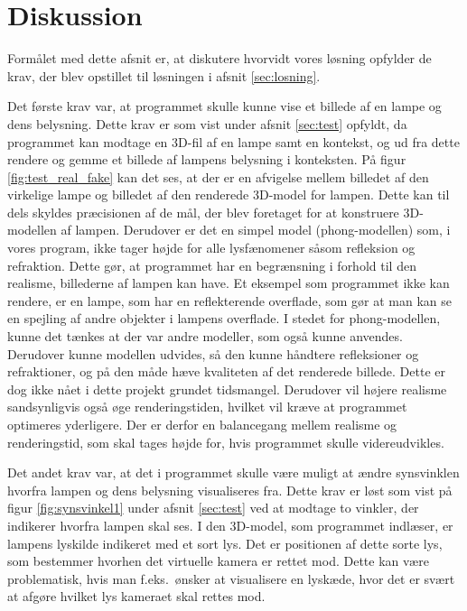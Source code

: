 \section{Diskussion}
\label{sec:diskussion}

Formålet med dette afsnit er, at diskutere hvorvidt vores løsning opfylder de krav, der blev opstillet til løsningen i afsnit \ref{sec:losning}.

Det første krav var, at programmet skulle kunne vise et billede af en lampe og dens belysning. Dette krav er som vist under afsnit \ref{sec:test} opfyldt, da programmet kan modtage en 3D-fil af en lampe samt en kontekst, og ud fra dette rendere og gemme et billede af lampens belysning i konteksten. På figur \ref{fig:test_real_fake} kan det ses, at der er en afvigelse mellem billedet af den virkelige lampe og billedet af den renderede 3D-model for lampen. Dette kan til dels skyldes præcisionen af de mål, der blev foretaget for at konstruere 3D-modellen af lampen. Derudover er det en simpel model (phong-modellen) som, i vores program, ikke tager højde for alle lysfænomener såsom refleksion og refraktion. Dette gør, at programmet har en begrænsning i forhold til den realisme, billederne af lampen kan have. Et eksempel som programmet ikke kan rendere, er en lampe, som har en reflekterende overflade, som gør at man kan se en spejling af andre objekter i lampens overflade. I stedet for phong-modellen, kunne det tænkes at der var andre modeller, som også kunne anvendes. Derudover kunne modellen udvides, så den kunne håndtere refleksioner og refraktioner, og på den måde hæve kvaliteten af det renderede billede. Dette er dog ikke nået i dette projekt grundet tidsmangel. Derudover vil højere realisme sandsynligvis også øge renderingstiden, hvilket vil kræve at programmet optimeres yderligere. Der er derfor en balancegang mellem realisme og renderingstid, som skal tages højde for, hvis programmet skulle videreudvikles.

Det andet krav var, at det i programmet skulle være muligt at ændre synsvinklen hvorfra lampen og dens belysning visualiseres fra. Dette krav er løst som vist på figur \ref{fig:synsvinkel1} under afsnit \ref{sec:test} ved at modtage to vinkler, der indikerer hvorfra lampen skal ses. I den 3D-model, som programmet indlæser, er lampens lyskilde indikeret med et sort lys. Det er positionen af dette sorte lys, som bestemmer hvorhen det virtuelle kamera er rettet mod. Dette kan være problematisk, hvis man f.eks.\ ønsker at visualisere en lyskæde, hvor det er svært at afgøre hvilket lys kameraet skal rettes mod. 

